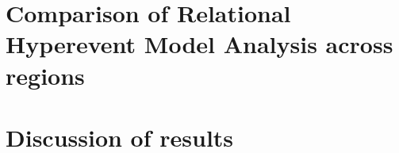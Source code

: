 


\section{Comparison of Relational Hyperevent Model Analysis across regions}
\label{sec:res_rhem}

\section{Discussion of results}
\label{sec:res_discussion}
